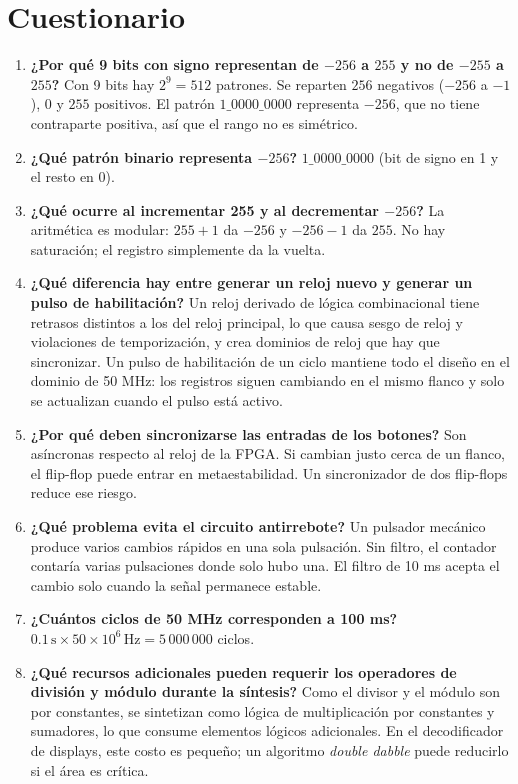 \documentclass[11pt,a4paper]{article}
\begin{document}
\section{Cuestionario}
\begin{enumerate}
  \item \textbf{¿Por qu\'e 9 bits con signo representan de $-256$ a $255$ y no de $-255$ a $255$?} Con 9 bits hay $2^9=512$ patrones. Se reparten $256$ negativos ($-256$ a $-1$), $0$ y $255$ positivos. El patr\'on $1\_0000\_0000$ representa $-256$, que no tiene contraparte positiva, as\'i que el rango no es sim\'etrico.
  \item \textbf{¿Qu\'e patr\'on binario representa $-256$?} $1\_0000\_0000$ (bit de signo en 1 y el resto en 0).
  \item \textbf{¿Qu\'e ocurre al incrementar 255 y al decrementar $-256$?} La aritm\'etica es modular: $255+1$ da $-256$ y $-256-1$ da $255$. No hay saturaci\'on; el registro simplemente da la vuelta.
  \item \textbf{¿Qu\'e diferencia hay entre generar un reloj nuevo y generar un pulso de habilitaci\'on?} Un reloj derivado de l\'ogica combinacional tiene retrasos distintos a los del reloj principal, lo que causa sesgo de reloj y violaciones de temporizaci\'on, y crea dominios de reloj que hay que sincronizar. Un pulso de habilitaci\'on de un ciclo mantiene todo el dise\~no en el dominio de 50 MHz: los registros siguen cambiando en el mismo flanco y solo se actualizan cuando el pulso est\'a activo.
  \item \textbf{¿Por qu\'e deben sincronizarse las entradas de los botones?} Son as\'incronas respecto al reloj de la FPGA. Si cambian justo cerca de un flanco, el flip-flop puede entrar en metaestabilidad. Un sincronizador de dos flip-flops reduce ese riesgo.
  \item \textbf{¿Qu\'e problema evita el circuito antirrebote?} Un pulsador mec\'anico produce varios cambios r\'apidos en una sola pulsaci\'on. Sin filtro, el contador contar\'ia varias pulsaciones donde solo hubo una. El filtro de 10 ms acepta el cambio solo cuando la se\~nal permanece estable.
  \item \textbf{¿Cu\'antos ciclos de 50 MHz corresponden a 100 ms?} $0.1\,\text{s}\times 50\times 10^{6}\,\text{Hz} = 5\,000\,000$ ciclos.
  \item \textbf{¿Qu\'e recursos adicionales pueden requerir los operadores de divisi\'on y m\'odulo durante la s\'intesis?} Como el divisor y el m\'odulo son por constantes, se sintetizan como l\'ogica de multiplicaci\'on por constantes y sumadores, lo que consume elementos l\'ogicos adicionales. En el decodificador de displays, este costo es peque\~no; un algoritmo \emph{double dabble} puede reducirlo si el \'area es cr\'itica.
\end{enumerate}
\end{document}
